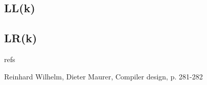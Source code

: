 \documentclass[../../agregation.tex]{subfiles}
\begin{document}
\subsection{LL(k)}

\subsection{LR(k)}

refs

Reinhard Wilhelm, Dieter Maurer, Compiler design, p. 281-282

\ifallthenelse{
	\dvts
}{}
\end{document}
